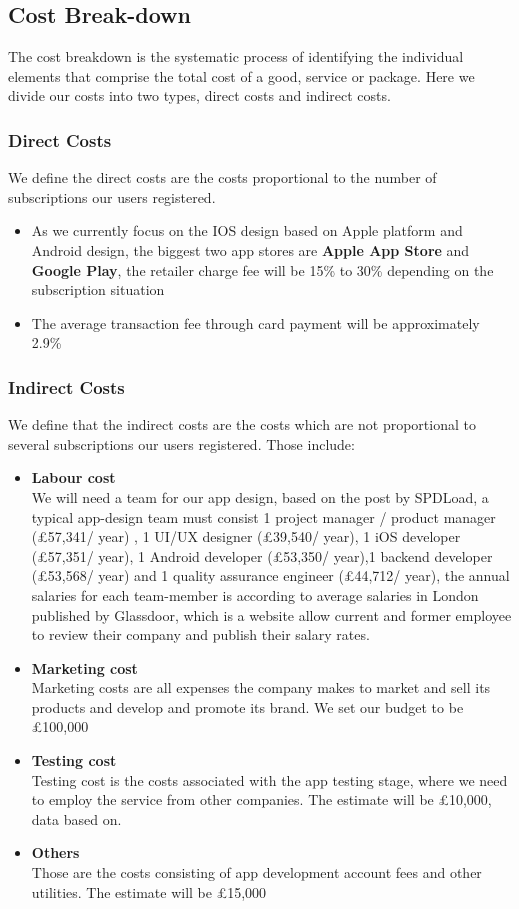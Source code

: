 \subsection{Cost Break-down}
The cost breakdown is the systematic process of identifying the individual elements that comprise the total cost of a good, service or package. Here we divide our costs into two types, direct costs and indirect costs.
\subsubsection{Direct Costs}
We define the direct costs are the costs proportional to the number of subscriptions our users registered.
\begin{itemize}
\item As we currently focus on the IOS design based on Apple platform and Android design, the biggest two app stores are \textbf{Apple App Store} and \textbf{Google Play}, the retailer charge fee will be 15\% to 30\% depending on the subscription situation
\item The average transaction fee through card payment will be approximately 2.9\%
\end{itemize}


\subsubsection{Indirect Costs}
We define that the indirect costs are the costs which are not proportional to several subscriptions our users registered. Those include:
\begin{itemize}
\item \textbf{Labour cost}
\\We will need a team for our app design, based on the post by SPDLoad, a typical app-design team must consist 1 project manager / product manager (£57,341/ year) , 1 UI/UX designer (£39,540/ year), 1 iOS developer (£57,351/ year), 1 Android developer (£53,350/ year),1 backend developer (£53,568/ year) and 1 quality assurance engineer (£44,712/ year), the annual salaries for each team-member is according to average salaries in London published by Glassdoor, which is a website allow current and former employee to review their company and publish their salary rates.
\item \textbf{Marketing cost}
\\ Marketing costs are all expenses the company makes to market and sell its products and develop and promote its brand. We set our budget to be £100,000
\item \textbf{Testing cost}
\\ Testing cost is the costs associated with the app testing stage, where we need to employ the service from other companies. The estimate will be £10,000, data based on.
\item \textbf{Others}
\\Those are the costs consisting of app development account fees and other utilities. The estimate will be £15,000
\end{itemize}

